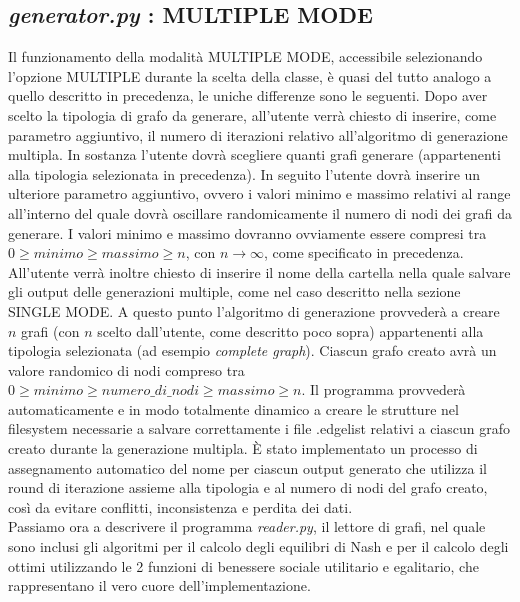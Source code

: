 \subsection{\textit{generator.py} : MULTIPLE MODE}
\justify
Il funzionamento della modalità MULTIPLE MODE, accessibile selezionando l'opzione MULTIPLE durante la scelta della classe, è quasi del tutto analogo a quello descritto in precedenza, le uniche differenze sono le seguenti. Dopo aver scelto la tipologia di grafo da generare, all'utente verrà chiesto di inserire, come parametro aggiuntivo, il numero di iterazioni relativo all'algoritmo di generazione multipla. In sostanza l'utente dovrà scegliere quanti grafi generare (appartenenti alla tipologia selezionata in precedenza). In seguito l'utente dovrà inserire un ulteriore parametro aggiuntivo, ovvero i valori minimo e massimo relativi al range all'interno del quale dovrà oscillare randomicamente il numero di nodi dei grafi da generare. I valori minimo e massimo dovranno ovviamente essere compresi tra \(0 \geq minimo \geq massimo \geq n\), con \(n\to\infty\), come specificato in precedenza. All'utente verrà inoltre chiesto di inserire il nome della cartella nella quale salvare gli output delle generazioni multiple, come nel caso descritto nella sezione SINGLE MODE. A questo punto l'algoritmo di generazione provvederà a creare \(n\) grafi (con \(n\) scelto dall'utente, come descritto poco sopra) appartenenti alla tipologia selezionata (ad esempio \textit{complete graph}). Ciascun grafo creato avrà un valore randomico di nodi compreso tra \(0 \geq minimo \geq numero\_di\_nodi \geq massimo \geq n\). Il programma provvederà automaticamente e in modo totalmente dinamico a creare le strutture nel filesystem necessarie a salvare correttamente i file .edgelist relativi a ciascun grafo creato durante la generazione multipla. È stato implementato un processo di assegnamento automatico del nome per ciascun output generato che utilizza il round di iterazione assieme alla tipologia e al numero di nodi del grafo creato, così da evitare conflitti, inconsistenza e perdita dei dati.\\
Passiamo ora a descrivere il programma \textit{reader.py}, il lettore di grafi, nel quale sono inclusi gli algoritmi per il calcolo degli equilibri di Nash e per il calcolo degli ottimi utilizzando le 2 funzioni di benessere sociale utilitario e egalitario, che rappresentano il vero cuore dell'implementazione.\\

